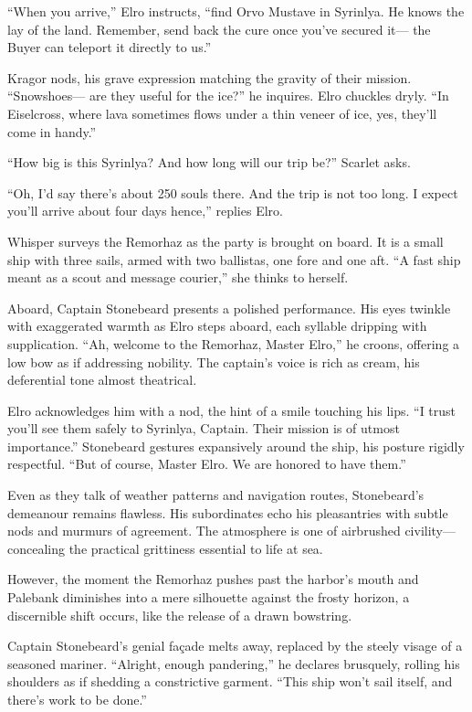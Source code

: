 \documentclass[
  letterpaper,12pt,twoside,twocolumn,openany,
  nodeprecatedcode,bg=full]{dndbook}
\begin{document}
``When you arrive,'' Elro instructs, ``find Orvo Mustave in Syrinlya. He
knows the lay of the land. Remember, send back the cure once you've
secured it--- the Buyer can teleport it directly to us.''

Kragor nods, his grave expression matching the gravity of their mission.
``Snowshoes--- are they useful for the ice?'' he inquires. Elro chuckles
dryly. ``In Eiselcross, where lava sometimes flows under a thin veneer
of ice, yes, they'll come in handy.''

``How big is this Syrinlya? And how long will our trip be?'' Scarlet
asks.

``Oh, I'd say there's about 250 souls there. And the trip is not too
long. I expect you'll arrive about four days hence,'' replies Elro.

Whisper surveys the Remorhaz as the party is brought on board. It is a
small ship with three sails, armed with two ballistas, one fore and one
aft. ``A fast ship meant as a scout and message courier,'' she thinks to
herself.

Aboard, Captain Stonebeard presents a polished performance. His eyes
twinkle with exaggerated warmth as Elro steps aboard, each syllable
dripping with supplication. ``Ah, welcome to the Remorhaz, Master
Elro,'' he croons, offering a low bow as if addressing nobility. The
captain's voice is rich as cream, his deferential tone almost
theatrical.

Elro acknowledges him with a nod, the hint of a smile touching his lips.
``I trust you'll see them safely to Syrinlya, Captain. Their mission is
of utmost importance.'' Stonebeard gestures expansively around the ship,
his posture rigidly respectful. ``But of course, Master Elro. We are
honored to have them.''

Even as they talk of weather patterns and navigation routes,
Stonebeard's demeanour remains flawless. His subordinates echo his
pleasantries with subtle nods and murmurs of agreement. The atmosphere
is one of airbrushed civility--- concealing the practical grittiness
essential to life at sea.

However, the moment the Remorhaz pushes past the harbor's mouth and
Palebank diminishes into a mere silhouette against the frosty horizon, a
discernible shift occurs, like the release of a drawn bowstring.

Captain Stonebeard's genial façade melts away, replaced by the steely
visage of a seasoned mariner. ``Alright, enough pandering,'' he declares
brusquely, rolling his shoulders as if shedding a constrictive garment.
``This ship won't sail itself, and there's work to be done.''
\end{document}
